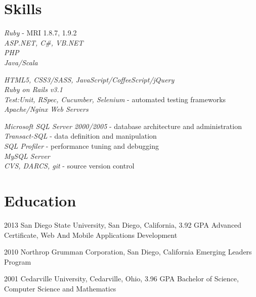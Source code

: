 \documentclass{article}
\begin{document}
\section{Skills}

{
\textit{Ruby} - MRI 1.8.7, 1.9.2\\
\textit{ASP.NET, C\#, VB.NET}\\
\textit{PHP}\\
\textit{Java/Scala}
}

{
\textit{HTML5, CSS3/SASS, JavaScript/CoffeeScript/jQuery}\\
\textit{Ruby on Rails v3.1}\\
\textit{Test:Unit, RSpec, Cucumber, Selenium} - automated testing frameworks\\
\textit{Apache/Nginx Web Servers}\\
}

{
\textit{Microsoft SQL Server 2000/2005} - database architecture and administration\\
\textit{Transact-SQL} - data definition and manipulation\\
\textit{SQL Profiler} - performance tuning and debugging\\
\textit{MySQL Server}\\
\textit{CVS, DARCS, git} - source version control
}


\section{Education}

\education
  {2013}
  {San Diego State University, San Diego, California, 3.92 GPA}
  {Advanced Certificate, Web And Mobile Applications Development}

\education
  {2010}
  {Northrop Grumman Corporation, San Diego, California}
  {Emerging Leaders Program}

\education
  {2001}
  {Cedarville University, Cedarville, Ohio, 3.96 GPA}
  {Bachelor of Science, Computer Science and Mathematics}
\end{document}
